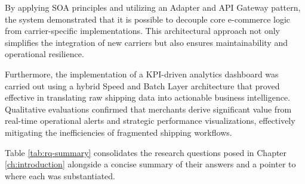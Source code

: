 \documentclass{imc-inf}
\begin{document}
By applying SOA principles and utilizing an Adapter and API Gateway pattern, the system demonstrated that it is possible to decouple core e-commerce logic from carrier-specific implementations.
This architectural approach not only simplifies the integration of new carriers but also ensures maintainability and operational resilience.

Furthermore, the implementation of a KPI-driven analytics dashboard was carried out using a hybrid Speed and Batch Layer architecture that proved effective in translating raw shipping data into actionable business intelligence.
Qualitative evaluations confirmed that merchants derive significant value from real-time operational alerts and strategic performance visualizations, effectively mitigating the inefficiencies of fragmented shipping workflows.

Table \ref{tab:rq-summary} consolidates the research questions posed in Chapter \ref{ch:introduction} alongside a concise summary of their answers and a pointer to where each was substantiated.
\end{document}
